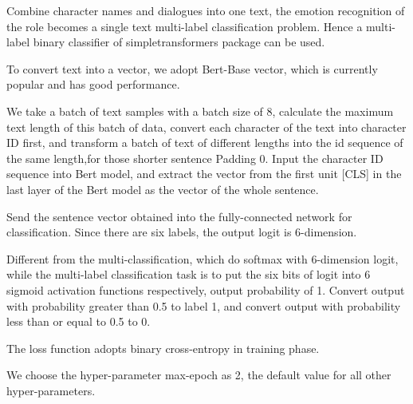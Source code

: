 \documentclass[12pt,twocolumn,letterpaper]{article}
\begin{document}
 Combine character names and dialogues into one text, the emotion recognition of the role becomes a single text multi-label classification problem. Hence a multi-label binary classifier of simpletransformers package can be used.

 To convert text into a vector, we adopt Bert-Base vector, which is currently popular and has good performance.  

 We take a batch of text samples with a batch size of 8, calculate the maximum text length of this batch of data, convert each character of the text into character ID first, and transform a batch of text of different lengths into the id sequence of the same length,for those shorter sentence Padding 0.
 Input the character ID sequence into Bert model, and extract the vector from the first unit [CLS] in the last layer of the Bert model as the vector of the whole sentence.  

 Send the sentence vector obtained into the fully-connected network for classification. Since there are six labels, the output logit is 6-dimension.  

 Different from the multi-classification, which do softmax with 6-dimension logit, while the multi-label classification task is to put the six bits of logit into 6 sigmoid activation functions respectively, output probability of 1.  
 Convert output with probability greater than 0.5 to label 1, and convert output with probability less than or equal to 0.5 to 0. 

The loss function adopts binary cross-entropy in training phase.

We choose the hyper-parameter max-epoch as 2, the default value for all other hyper-parameters. 
\end{document}
